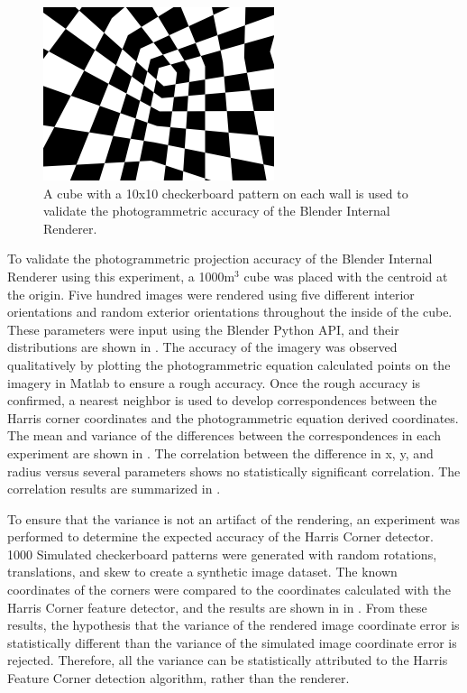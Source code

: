 \begin{figure}[H]
	\centering
	\includegraphics[height = 2in]{../fig/checkerRoom}
	\caption{A cube with a 10x10 checkerboard pattern on each wall is used to validate the photogrammetric accuracy of the Blender Internal Renderer.}
	\label{fig:checker}
\end{figure}

To validate the photogrammetric projection accuracy of the Blender Internal Renderer using this experiment, a 1000m$^3$ cube was placed with the centroid at the origin.  Five hundred images were rendered using five different interior orientations and random exterior orientations throughout the inside of the cube.  These parameters were input using the Blender Python API, and their distributions are shown in .  The accuracy of the imagery was observed qualitatively by plotting the photogrammetric equation calculated points on the imagery in Matlab to ensure a rough accuracy.  Once the rough accuracy is confirmed, a nearest neighbor is used to develop correspondences between the Harris corner coordinates and the photogrammetric equation derived coordinates.  The mean and variance of the differences between the correspondences in each experiment are shown in .  The correlation between the difference in x, y, and radius versus several parameters shows no statistically significant correlation.  The correlation results are summarized in .





To ensure that the variance is not an artifact of the rendering, an experiment was performed to determine the expected accuracy of the Harris Corner detector.  1000 Simulated checkerboard patterns were generated with random rotations, translations, and skew to create a synthetic image dataset.  The known coordinates of the corners were compared to the coordinates calculated with the Harris Corner feature detector, and the results are shown in in .  From these results, the hypothesis that the variance of the rendered image coordinate error is statistically different than the variance of the simulated image coordinate error is rejected.  Therefore, all the variance can be statistically attributed to the Harris Feature Corner detection algorithm, rather than the renderer. 

